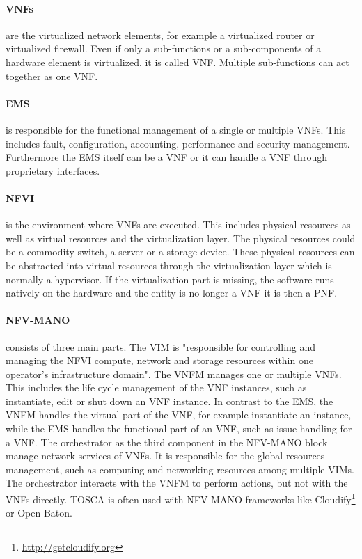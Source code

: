 \paragraph{\acp{VNF}} are the virtualized network elements, for example a virtualized router or virtualized firewall.
Even if only a sub-functions or a sub-components of a hardware element is virtualized, it is called \ac{VNF}.\autocite[cf.]{Kahn:2015}
Multiple sub-functions can act together as one \ac{VNF}.

\paragraph{\ac{EMS}} is responsible for the functional management of a single or multiple \acp{VNF}.\autocite[cf.]{Kahn:2015}
This includes fault, configuration, accounting, performance and security management.\autocite[cf.]{Kahn:2015}
Furthermore the \ac{EMS} itself can be a \ac{VNF} or it can handle a \ac{VNF} through proprietary interfaces.\autocite[cf.]{Kahn:2015}

\paragraph{\ac{NFVI}} is the environment where \acp{VNF} are executed.
This includes physical resources as well as virtual resources and the virtualization layer.
The physical resources could be a commodity switch, a server or a storage device.
These physical resources can be abstracted into virtual resources through the virtualization layer which is normally a hypervisor.
If the virtualization part is missing, the software runs natively on the hardware and the entity is no longer a \ac{VNF} it is then a \ac{PNF}.\autocite[cf.]{Kahn:2015}

\paragraph{\ac{NFV-MANO}} consists of three main parts.
The \ac{VIM} is "responsible for controlling and managing the NFVI compute, network and storage resources within one operator’s infrastructure domain"\autocite{Kahn:2015}.
The \ac{VNFM} manages one or multiple \acp{VNF}.
This includes the life cycle management of the \ac{VNF} instances, such as instantiate, edit or shut down an \ac{VNF} instance.\autocite[cf.]{Tosca:NFV}
In contrast to the \ac{EMS}, the \ac{VNFM} handles the virtual part of the \ac{VNF}, for example instantiate an instance, while the \ac{EMS} handles the functional part of an \ac{VNF}, such as issue handling for a \ac{VNF}.
The orchestrator as the third component in the \ac{NFV-MANO} block manage network services of \acp{VNF}.
It is responsible for the global resources management, such as computing and networking resources among multiple \acp{VIM}.\autocite[cf.]{Kahn:2015}
The orchestrator interacts with the \ac{VNFM} to perform actions, but not with the \acp{VNF} directly.\autocite[cf.]{Kahn:2015}
\ac{TOSCA} is often used with \ac{NFV-MANO} frameworks like Cloudify\footnote{\url{http://getcloudify.org}} or Open Baton.\autocite[cf.]{Tosca:NFV}

